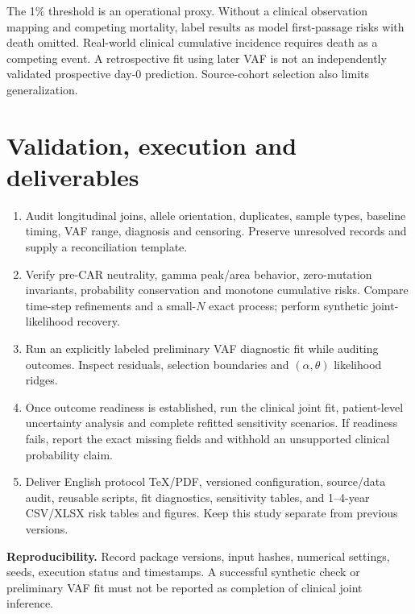 \documentclass[11pt]{article}
\begin{document}
The 1\% threshold is an operational proxy. Without a clinical observation mapping and competing mortality, label results as model first-passage risks with death omitted. Real-world clinical cumulative incidence requires death as a competing event. A retrospective fit using later VAF is not an independently validated prospective day-0 prediction. Source-cohort selection also limits generalization.

\section{Validation, execution and deliverables}
\begin{enumerate}
\item Audit longitudinal joins, allele orientation, duplicates, sample types, baseline timing, VAF range, diagnosis and censoring. Preserve unresolved records and supply a reconciliation template.
\item Verify pre-CAR neutrality, gamma peak/area behavior, zero-mutation invariants, probability conservation and monotone cumulative risks. Compare time-step refinements and a small-$N$ exact process; perform synthetic joint-likelihood recovery.
\item Run an explicitly labeled preliminary VAF diagnostic fit while auditing outcomes. Inspect residuals, selection boundaries and $(\alpha,\theta)$ likelihood ridges.
\item Once outcome readiness is established, run the clinical joint fit, patient-level uncertainty analysis and complete refitted sensitivity scenarios. If readiness fails, report the exact missing fields and withhold an unsupported clinical probability claim.
\item Deliver English protocol TeX/PDF, versioned configuration, source/data audit, reusable scripts, fit diagnostics, sensitivity tables, and 1--4-year CSV/XLSX risk tables and figures. Keep this study separate from previous versions.
\end{enumerate}
\textbf{Reproducibility.} Record package versions, input hashes, numerical settings, seeds, execution status and timestamps. A successful synthetic check or preliminary VAF fit must not be reported as completion of clinical joint inference.
\end{document}
